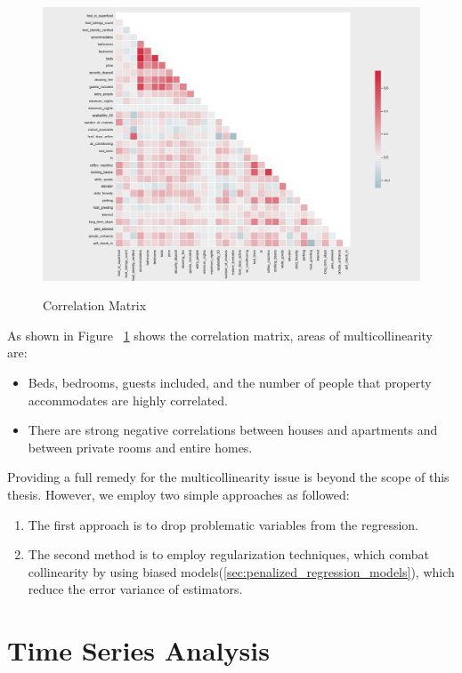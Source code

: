 \begin{figure}[H] \centering
\caption{Correlation Matrix}
\includegraphics[width=\textwidth,keepaspectratio]{figures/correlation-matrix.png}
\label{fig:correlation-matrix}
\end{figure}

As shown in Figure ~\ref{fig:correlation-matrix} shows the correlation matrix,
areas of multicollinearity are:
\begin{itemize}
    \item Beds, bedrooms, guests included, and the number of people that
        property accommodates are highly correlated.
    \item There are strong negative correlations between houses and apartments
        and between private rooms and entire homes.
\end{itemize}

Providing a full remedy for the multicollinearity issue is beyond the scope of
this thesis. However, we employ two  simple approaches as followed:

\begin{enumerate}
    \item The first approach is to drop problematic variables from the regression.
    \item The second method is to employ regularization techniques, which combat
        collinearity by using biased models(\ref{sec:penalized_regression_models}),
        which reduce the error variance of estimators.
\end{enumerate}

\section{Time Series Analysis}
\label{sec:time_series}

